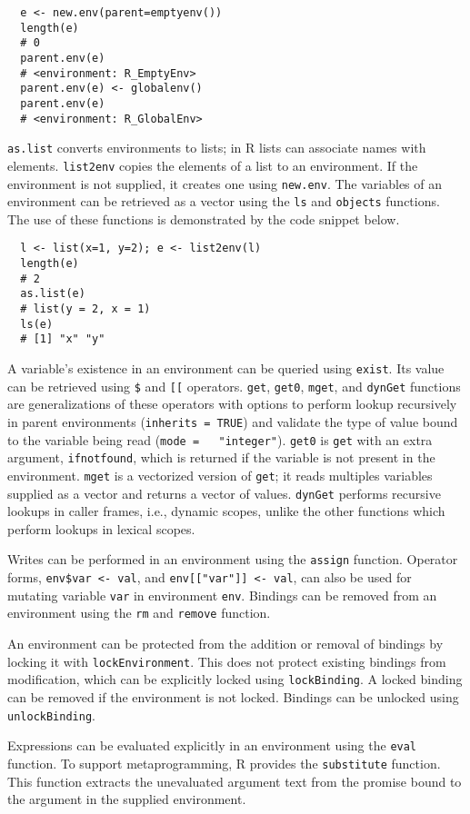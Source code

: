 \documentclass[10pt,review,sigplan,authorversion=true]{acmart}
\newcommand{\code}[1]{\lstinline |#1|\xspace}
\newcommand{\newEnv}{\code{new.env}}
\newcommand{\asList}{\code{as.list}}
\newcommand{\listToEnv}{\code{list2env}}
\newcommand{\ls}{\code{ls}}
\newcommand{\objects}{\code{objects}}
\newcommand{\subDollar}{\code{$}}
\newcommand{\subBracket}{\code{[[}}
\newcommand{\exist}{\code{exist}}
\newcommand{\get}{\code{get}}
\newcommand{\getZero}{\code{get0}}
\newcommand{\mget}{\code{mget}}
\newcommand{\dynGet}{\code{dynGet}}
\newcommand{\assign}{\code{assign}}
\newcommand{\remove}{\code{remove}}
\renewcommand{\rm}{\code{rm}}
\newcommand{\lockEnvironment}{\code{lockEnvironment}}
\newcommand{\lockBinding}{\code{lockBinding}}
\newcommand{\unlockBinding}{\code{unlockBinding}}
\newcommand{\eval}{\code{eval}}
\newcommand{\substitute}{\code{substitute}}
\begin{document}
\begin{lstlisting}
  e <- new.env(parent=emptyenv())
  length(e)
  # 0
  parent.env(e)
  # <environment: R_EmptyEnv>
  parent.env(e) <- globalenv()
  parent.env(e)
  # <environment: R_GlobalEnv>
\end{lstlisting}

\asList converts environments to lists; in R lists can associate names with
elements. \listToEnv copies the elements of a list to an environment. If the
environment is not supplied, it creates one using \newEnv. The variables of an
environment can be retrieved as a vector using the \ls and \objects functions.
The use of these functions is demonstrated by the code snippet below.

\begin{lstlisting}
  l <- list(x=1, y=2); e <- list2env(l)
  length(e)
  # 2
  as.list(e)
  # list(y = 2, x = 1)
  ls(e)
  # [1] "x" "y"
\end{lstlisting}

\noindent
A variable's existence in an environment can be queried using \exist. Its value
can be retrieved using \subDollar and \subBracket operators. \get, \getZero,
\mget, and \dynGet functions are generalizations of these operators with options
to perform lookup recursively in parent environments (\code{inherits = TRUE})
and validate the type of value bound to the variable being read (\code{mode =
  "integer"}). \getZero is \get with an extra argument, \code{ifnotfound}, which
is returned if the variable is not present in the environment. \mget is a
vectorized version of \get; it reads multiples variables supplied as a vector
and returns a vector of values. \dynGet performs recursive lookups in caller
frames, i.e., dynamic scopes, unlike the other functions which perform lookups in
lexical scopes.

Writes can be performed in an environment using the \assign function. Operator
forms, \code{env$var <- val}, and \code{env[["var"]] <- val}, can also be used
for mutating variable \code{var} in environment \code{env}. Bindings
can be removed from an environment using the \rm and \remove function.

An environment can be protected from the addition or removal of bindings by
locking it with \lockEnvironment. This does not protect existing bindings from
modification, which can be explicitly locked using \lockBinding. A locked
binding can be removed if the environment is not locked. Bindings can be
unlocked using \unlockBinding.

Expressions can be evaluated explicitly in an environment using the \eval
function. To support metaprogramming, R provides the \substitute function. This
function extracts the unevaluated argument text from the promise bound to the
argument in the supplied environment.
\end{document}
